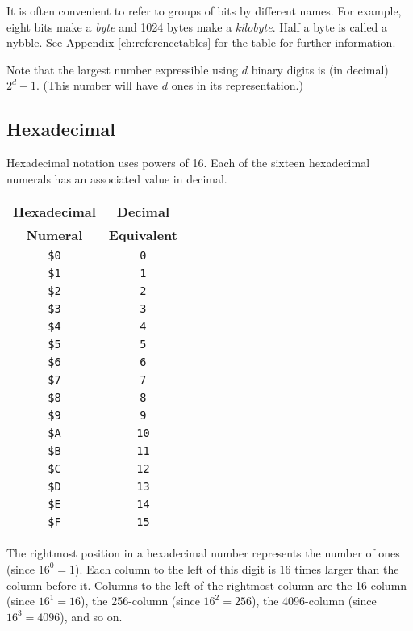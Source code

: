 It is often convenient to refer to groups of bits by different names. For example, eight bits make a {\it byte} and 1024 bytes make a {\it kilobyte}. Half a byte is called a nybble.
See Appendix \ref{ch:referencetables}  for the  table for further information.

Note that the largest number expressible using $d$ binary digits is (in decimal) $2^{d} - 1$. (This number will have $d$ ones in its representation.)

\subsection{Hexadecimal}
Hexadecimal notation uses powers of 16. Each of the sixteen hexadecimal numerals has an associated value in decimal.

\begin{center}
	\begin{tabular}{|c|c|}
		\hline
		{\bf Hexadecimal} & {\bf Decimal} \\
		{\bf Numeral} & {\bf Equivalent} \\ \hhline{|=|=|}
		\texttt{\$0} & \texttt{0} \\ \hline
		\texttt{\$1} & \texttt{1} \\ \hline
		\texttt{\$2} & \texttt{2} \\ \hline
		\texttt{\$3} & \texttt{3} \\ \hline
		\texttt{\$4} & \texttt{4} \\ \hline
		\texttt{\$5} & \texttt{5} \\ \hline
		\texttt{\$6} & \texttt{6} \\ \hline
		\texttt{\$7} & \texttt{7} \\ \hline
		\texttt{\$8} & \texttt{8} \\ \hline
		\texttt{\$9} & \texttt{9} \\ \hline
		\texttt{\$A} & \texttt{10} \\ \hline
		\texttt{\$B} & \texttt{11} \\ \hline
		\texttt{\$C} & \texttt{12} \\ \hline
		\texttt{\$D} & \texttt{13} \\ \hline
		\texttt{\$E} & \texttt{14} \\ \hline
		\texttt{\$F} & \texttt{15} \\ \hline
	\end{tabular}
\end{center}

The rightmost position in a hexadecimal number represents the number of ones (since $16^{0} = 1$). Each column to the left of this digit is 16 times larger than the column before it. Columns to the left of the rightmost column are the 16-column (since $16^{1} = 16$), the 256-column (since $16^{2} = 256$), the 4096-column (since $16^{3} = 4096$), and so on.

